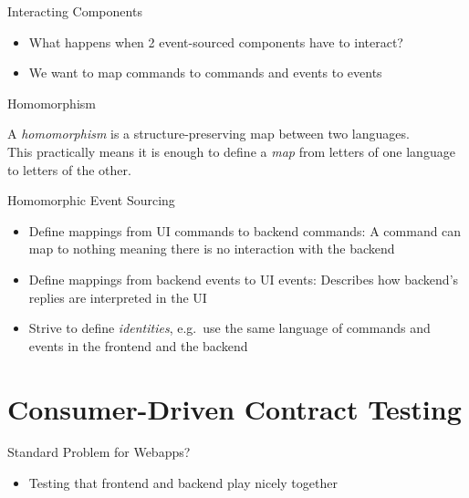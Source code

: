 \begin{frame}[fragile]{Interacting Components}
  \begin{itemize}
  \item What happens when 2 event-sourced components have to interact?
  \item We want to map commands to commands and events to events
  \end{itemize}
\end{frame}


\begin{frame}[fragile]{Homomorphism}

  A \emph{homomorphism} is a structure-preserving map between two languages.
   \\[2em]

  This practically means it is enough to
  define a \emph{map} from letters of one language to letters of the other.

\end{frame}

\begin{frame}[fragile]{Homomorphic Event Sourcing}
  \begin{itemize}[<+->]
  \item Define mappings from UI commands to backend commands: A command
    can map to nothing meaning there is no interaction with
    the backend
  \item Define mappings from backend events to UI events: Describes how
    backend's replies are interpreted in the UI
  \item Strive to define \emph{identities}, e.g.~use the same language of commands and events in the frontend and the backend
  \end{itemize}
\end{frame}

\part{Consumer-Driven Contract Testing}

\begin{frame}[fragile]{Standard Problem for Webapps?}

\begin{itemize}
\item Testing that frontend and backend play nicely together
\end{itemize}

\end{frame}

